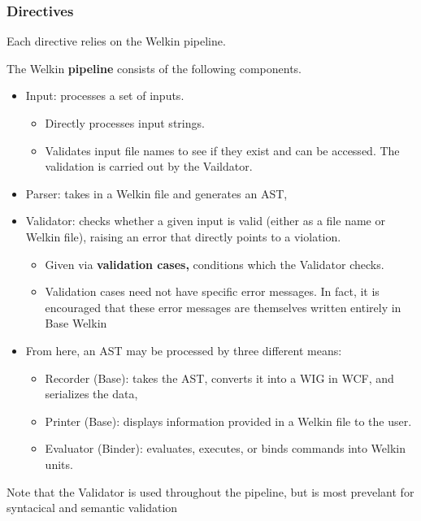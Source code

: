 \subsubsection*{Directives}
Each directive relies on the Welkin pipeline.

\begin{definition}[Pipeline]

The Welkin \textbf{pipeline} consists of the following components.

\begin{itemize}
  \item Input: processes a set of inputs.
  \begin{itemize}
    \item Directly processes input strings.
    \item Validates input file names to see if they exist and can be accessed. The validation is carried out by the Vaildator.
  \end{itemize}
  \item Parser: takes in a Welkin file and generates an AST,
  \item Validator: checks whether a given input is valid (either as a file name or Welkin file), raising an error that directly points to a violation.
      \begin{itemize}
\item Given via \textbf{validation cases,} conditions which the Validator checks.
  \item Validation cases need not have specific error messages. In fact, it is encouraged that these error messages are themselves written entirely in Base Welkin %
\end{itemize}
  \item From here, an AST may be processed by three different means:
		\begin{itemize}
		  \item Recorder (Base): takes the AST, converts it into a WIG in WCF, and serializes the data,
		  \item Printer (Base): displays information provided in a Welkin file to the user.
		  \item Evaluator (Binder): evaluates, executes, or binds commands into Welkin units.
		\end{itemize}
\end{itemize}
Note that the Validator is used throughout the pipeline, but is most prevelant for syntacical and semantic validation
\end{definition}

